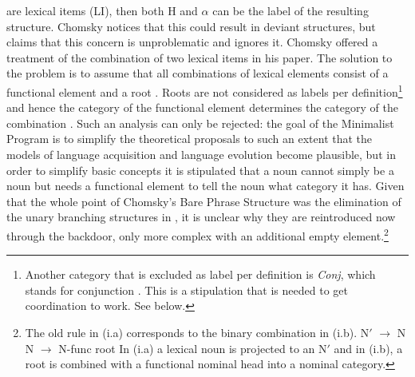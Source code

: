 are lexical items (LI), then both H and $\alpha$ can be the label of the resulting
structure. Chomsky notices that this could result in deviant structures, but
claims that this concern is unproblematic and ignores it. 
Chomsky offered a treatment of the combination of two lexical items
in his \citeyear{Chomsky2013a} paper. The solution to the problem is to assume that all combinations of
lexical elements consist of a functional element and a root \citep{Marantz97a,Borer2005a-u}. Roots are not considered as labels per definition\footnote{%
  Another category that is excluded as label per definition is \emph{Conj}, which stands for
  conjunction \citep[--46]{Chomsky2013a}. This is a stipulation that is needed to get
  coordination to work. See below.
} and hence the category of the functional element
determines the category of the combination \citep[]{Chomsky2013a}. 
Such an analysis can only be rejected: the goal of the Minimalist Program is to simplify the
theoretical proposals to such an extent that the models of language acquisition and language evolution
become plausible, but in order to simplify basic concepts it is stipulated that a noun cannot simply
be a noun but needs a functional element to tell the noun what category it has. Given that the whole
point of Chomsky's Bare Phrase Structure \citep{Chomsky95b-u} was the elimination of the unary branching structures
in \xbart, it is unclear why they are reintroduced now through the backdoor, only more complex with
an additional empty element.\footnote{%
   The old \xbar rule in (i.a) corresponds to the binary combination in (i.b).
\eal
\ex N$'$ $\to$ N
\ex N $\to$ N-func root 
\zl
In (i.a) a lexical noun is projected to an N$'$ and in (i.b), a root is combined with a functional
nominal head into a nominal category.
}
